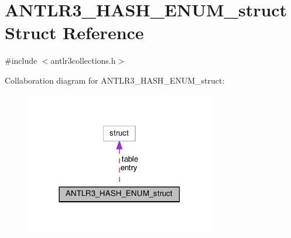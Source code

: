 \hypertarget{struct_a_n_t_l_r3___h_a_s_h___e_n_u_m__struct}{\section{A\-N\-T\-L\-R3\-\_\-\-H\-A\-S\-H\-\_\-\-E\-N\-U\-M\-\_\-struct Struct Reference}
\label{struct_a_n_t_l_r3___h_a_s_h___e_n_u_m__struct}
}


{\ttfamily \#include $<$antlr3collections.\-h$>$}



Collaboration diagram for A\-N\-T\-L\-R3\-\_\-\-H\-A\-S\-H\-\_\-\-E\-N\-U\-M\-\_\-struct\-:
\nopagebreak
\begin{figure}[H]
\begin{center}
\leavevmode
\includegraphics[width=234pt]{struct_a_n_t_l_r3___h_a_s_h___e_n_u_m__struct__coll__graph}
\end{center}
\end{figure}
